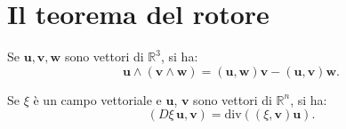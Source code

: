 \documentclass[italian,a4paper]{scrartcl}
\newcommand{\RR}{{\mathbb R}}
\renewcommand{\vec}{\mathbf}
\renewcommand{\div}{\mathrm{div}}
\begin{document}
\begin{comment}
In effetti possiamo definire
\[
 \alpha_{\vec u}(\vec{v_1},\dots,\vec{v_{k-1}}) = \omega_{\Phi(\vec
   u)}(\partial \Phi/\partial \vec{v_1}, \dots, \partial \Phi/\partial\vec{v_{k-1}})
\]
cosicché si ha, per definizione di integrale lungo $\Phi_j^\pm$,
\begin{align*}
  \int_{\Phi_j^\pm} \omega 
  &= \int_{[0,1]^{k-1}} \omega_{\Phi_j^\pm(\vec v)} \left(\frac{\partial \Phi_j^\pm}{\partial v_1}, \dots , \frac{\partial \Phi_j^\pm}
  {\partial v_{k-1}}\right)\, dv_1\dots dv_{k-1}  \\
  &= \int_{F_k^\pm}
  \alpha_{\vec
    u}(\vec{e_1},\dots,\vec{e_{j-1}},\vec{e_{j+1}},\vec{e_{k-1}})\,
  du_1 \dots du_{j-1}\, du_{j+1} \dots du_{k-1}
\end{align*}
dove $F_k^+$ è la faccia del cubo $[0,1]^k$ dove $x_j=1$, mentre
$F_k^-$ e la faccia dove $x_j=0$.
\end{proof}
\end{comment} %

\section{Il teorema del rotore}
\begin{lemma}
\label{lm:triple_external_product}
Se $\vec u,\vec v, \vec w$ sono vettori di $\RR^3$, si ha:
\[
\vec u\wedge (\vec v \wedge \vec w)  = (\vec u,\vec w) \vec v - (\vec
u,\vec v) \vec w.
\]
\end{lemma}

\begin{lemma}
\label{lm:div_jacobian}
Se $\xi$ è un campo vettoriale e $\vec u$, $\vec v$ sono vettori di
$\RR^n$, si ha:
\[
(D\xi\, \vec u,\vec v) = \div ((\xi,\vec v)\vec u).
\]
\end{lemma}
\end{document}
